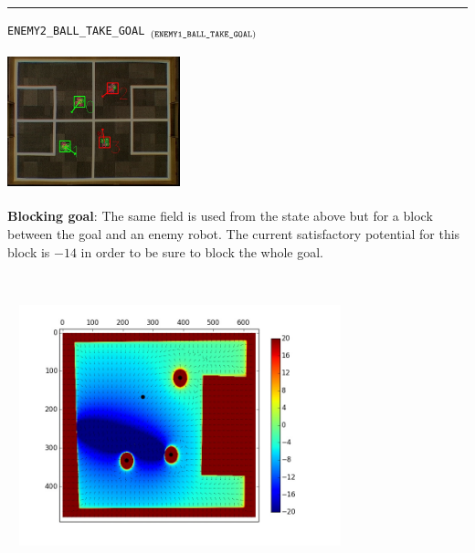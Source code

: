 \documentclass[a4paper,12pt]{article}
\begin{document}
\begin{minipage}{\linewidth}
\rule{\textwidth}{1pt}
\texttt{ENEMY2\_BALL\_TAKE\_GOAL} $_{\text{(\texttt{ENEMY1\_BALL\_TAKE\_GOAL})}}$\medskip

\begin{minipage}{0.5\textwidth}
\begin{center}
\includegraphics[height=40mm,width=50mm]{v1_2.jpg}\medskip
\end{center}

\textbf{Blocking goal}: The same field is used from the state above but for a block between the goal and an enemy robot. The current satisfactory potential for this block is $-14$ in order to be sure to block the whole goal.
\end{minipage}
~
\begin{minipage}{0.5\textwidth}
\includegraphics[height=70mm,width=100mm,trim=65 55 65 35,clip]{p2.jpg}\medskip
\end{minipage}
\end{minipage}\medskip
\end{document}
